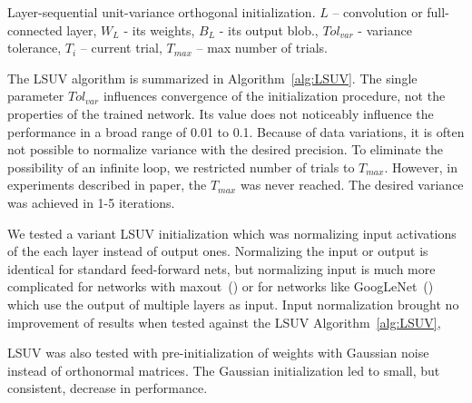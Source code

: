 \documentclass{article} \clearpage{}\usepackage{iclr2016_conference,times}
\newcommand{\algrule}[1][.2pt]{\par\vskip.5\baselineskip\hrule height #1\par\vskip.5\baselineskip}
\begin{document}
\begin{algorithm}[b]
\caption{Layer-sequential unit-variance orthogonal initialization.
$L$ -- convolution or full-connected layer, $W_L$ -  its weights, $B_L$ - its output blob.,
$\textit{Tol}_\textit{var}$ - variance tolerance,  $T_i$ -- current trial, $T_\textit{max}$ -- max number of trials.}
\label{alg:LSUV}
\end{algorithm}

The LSUV algorithm is summarized in Algorithm~\ref{alg:LSUV}.
The single parameter $\textit{Tol}_\textit{var}$ influences convergence of the initialization procedure, not the properties of the trained network. Its value does not noticeably influence the performance in a broad range of 0.01 to 0.1. 
 Because of data variations, it is often not possible to normalize variance with the desired precision. To eliminate the possibility of an infinite loop, we restricted number of trials to $T_\textit{max}$. However, in experiments described in paper, the $T_\textit{max}$ was never reached. The desired variance was achieved in 1-5 iterations.
 
We tested a variant LSUV initialization which was normalizing input activations of the each layer instead of output ones. Normalizing the input or output is identical for standard feed-forward nets, but normalizing input is much more complicated for networks with maxout~(\cite{Maxout2013}) or for networks like GoogLeNet~(\cite{Googlenet2015}) which use the output of multiple layers as input. Input normalization brought no improvement of results when tested against the LSUV Algorithm~\ref{alg:LSUV},

LSUV was also tested with pre-initialization of weights with Gaussian noise instead of orthonormal matrices. The Gaussian initialization led to small, but consistent, decrease in performance.  
\end{document}
